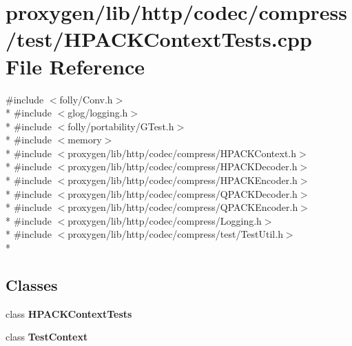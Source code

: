 \section{proxygen/lib/http/codec/compress/test/\+H\+P\+A\+C\+K\+Context\+Tests.cpp File Reference}
\label{HPACKContextTests_8cpp}
{\ttfamily \#include $<$folly/\+Conv.\+h$>$}\\*
{\ttfamily \#include $<$glog/logging.\+h$>$}\\*
{\ttfamily \#include $<$folly/portability/\+G\+Test.\+h$>$}\\*
{\ttfamily \#include $<$memory$>$}\\*
{\ttfamily \#include $<$proxygen/lib/http/codec/compress/\+H\+P\+A\+C\+K\+Context.\+h$>$}\\*
{\ttfamily \#include $<$proxygen/lib/http/codec/compress/\+H\+P\+A\+C\+K\+Decoder.\+h$>$}\\*
{\ttfamily \#include $<$proxygen/lib/http/codec/compress/\+H\+P\+A\+C\+K\+Encoder.\+h$>$}\\*
{\ttfamily \#include $<$proxygen/lib/http/codec/compress/\+Q\+P\+A\+C\+K\+Decoder.\+h$>$}\\*
{\ttfamily \#include $<$proxygen/lib/http/codec/compress/\+Q\+P\+A\+C\+K\+Encoder.\+h$>$}\\*
{\ttfamily \#include $<$proxygen/lib/http/codec/compress/\+Logging.\+h$>$}\\*
{\ttfamily \#include $<$proxygen/lib/http/codec/compress/test/\+Test\+Util.\+h$>$}\\*
\subsection*{Classes}
\begin{DoxyCompactItemize}
\item 
class {\bf H\+P\+A\+C\+K\+Context\+Tests}
\item 
class {\bf Test\+Context}
\end{DoxyCompactItemize}
